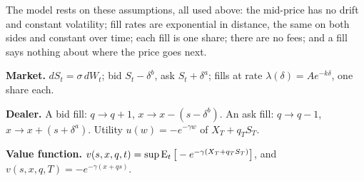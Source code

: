 \begin{remark}
The model rests on these assumptions, all used above: the mid-price has no drift and constant volatility; fill rates are exponential in distance, the same on both sides and constant over time; each fill is one share; there are no fees; and a fill says nothing about where the price goes next.
\end{remark}

\begin{recall}
\textbf{Market.} $dS_t=\sigma\,dW_t$; bid $S_t-\delta^b$, ask $S_t+\delta^a$; fills at rate $\lambda(\delta)=Ae^{-k\delta}$, one share each.

\textbf{Dealer.} A bid fill: $q\to q+1$, $x\to x-(s-\delta^b)$. An ask fill: $q\to q-1$, $x\to x+(s+\delta^a)$. Utility $u(w)=-e^{-\gamma w}$ of $X_T+q_TS_T$.

\textbf{Value function.} $v(s,x,q,t)=\sup\operatorname{E}_t\big[-e^{-\gamma(X_T+q_TS_T)}\big]$, and $v(s,x,q,T)=-e^{-\gamma(x+qs)}$.
\end{recall}
